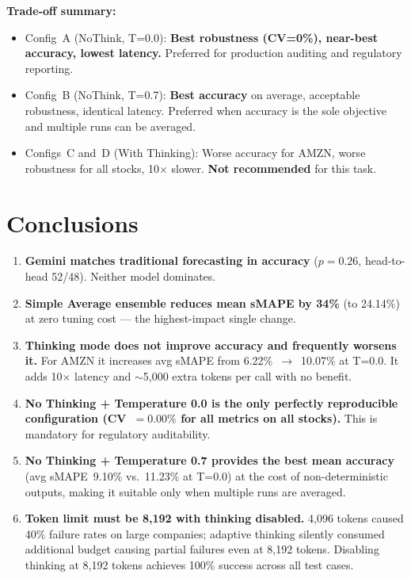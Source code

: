 \documentclass[11pt,a4paper]{article}
\begin{document}
\textbf{Trade-off summary:}
\begin{itemize}
  \item Config~A (NoThink, T=0.0): \textbf{Best robustness (CV=0\%), near-best accuracy,
        lowest latency.} Preferred for production auditing and regulatory reporting.
  \item Config~B (NoThink, T=0.7): \textbf{Best accuracy} on average, acceptable
        robustness, identical latency.  Preferred when accuracy is the sole
        objective and multiple runs can be averaged.
  \item Configs~C and~D (With Thinking): Worse accuracy for AMZN, worse robustness
        for all stocks, 10$\times$ slower.  \textbf{Not recommended} for this task.
\end{itemize}

\section{Conclusions}

\begin{enumerate}
  \item \textbf{Gemini matches traditional forecasting in accuracy}
        ($p = 0.26$, head-to-head 52/48).  Neither model dominates.

  \item \textbf{Simple Average ensemble reduces mean sMAPE by 34\%}
        (to 24.14\%) at zero tuning cost --- the highest-impact single change.

  \item \textbf{Thinking mode does not improve accuracy and frequently worsens it.}
        For AMZN it increases avg sMAPE from 6.22\%~$\to$~10.07\% at T=0.0.
        It adds 10$\times$ latency and $\sim$5{,}000 extra tokens per call with
        no benefit.

  \item \textbf{No Thinking + Temperature 0.0 is the only perfectly reproducible
        configuration (CV~$= 0.00\%$ for all metrics on all stocks).}
        This is mandatory for regulatory auditability.

  \item \textbf{No Thinking + Temperature 0.7 provides the best mean accuracy}
        (avg sMAPE~9.10\% vs.\ 11.23\% at T=0.0) at the cost of non-deterministic
        outputs, making it suitable only when multiple runs are averaged.

  \item \textbf{Token limit must be 8{,}192 with thinking disabled.}
        4{,}096 tokens caused 40\% failure rates on large companies; adaptive
        thinking silently consumed additional budget causing partial failures
        even at 8{,}192 tokens.  Disabling thinking at 8{,}192 tokens achieves
        100\% success across all test cases.
\end{enumerate}
\end{document}
